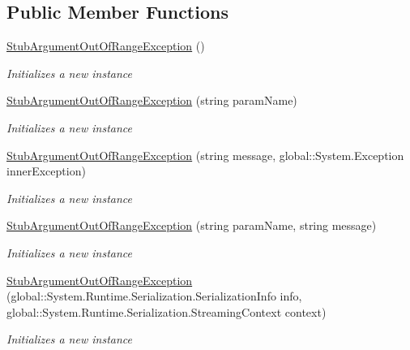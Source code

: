 \subsection*{Public Member Functions}
\begin{DoxyCompactItemize}
\item 
\hyperlink{class_system_1_1_fakes_1_1_stub_argument_out_of_range_exception_a3666d2fb6ea8b1d23d1d0e88916492ff}{Stub\-Argument\-Out\-Of\-Range\-Exception} ()
\begin{DoxyCompactList}\small\item\em Initializes a new instance\end{DoxyCompactList}\item 
\hyperlink{class_system_1_1_fakes_1_1_stub_argument_out_of_range_exception_a4a6d752aa518009a1c38603c354a86f1}{Stub\-Argument\-Out\-Of\-Range\-Exception} (string param\-Name)
\begin{DoxyCompactList}\small\item\em Initializes a new instance\end{DoxyCompactList}\item 
\hyperlink{class_system_1_1_fakes_1_1_stub_argument_out_of_range_exception_ac5977d053f3c3920978b919d35455a78}{Stub\-Argument\-Out\-Of\-Range\-Exception} (string message, global\-::\-System.\-Exception inner\-Exception)
\begin{DoxyCompactList}\small\item\em Initializes a new instance\end{DoxyCompactList}\item 
\hyperlink{class_system_1_1_fakes_1_1_stub_argument_out_of_range_exception_acbcca534ed10da99d7ee3318870742b4}{Stub\-Argument\-Out\-Of\-Range\-Exception} (string param\-Name, string message)
\begin{DoxyCompactList}\small\item\em Initializes a new instance\end{DoxyCompactList}\item 
\hyperlink{class_system_1_1_fakes_1_1_stub_argument_out_of_range_exception_ae4fae5ea4c3d40d282ff65ee4a999579}{Stub\-Argument\-Out\-Of\-Range\-Exception} (global\-::\-System.\-Runtime.\-Serialization.\-Serialization\-Info info, global\-::\-System.\-Runtime.\-Serialization.\-Streaming\-Context context)
\begin{DoxyCompactList}\small\item\em Initializes a new instance\end{DoxyCompactList}\item 

\end{DoxyCompactItemize}
